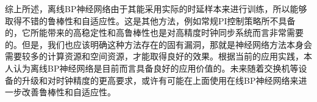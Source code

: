 综上所述，离线BP神经网络由于其能采用实际的时延样本来进行训练，所以能够取得不错的鲁棒性和自适应性。这是其他方法，例如常规PI控制策略所不具备的，它所能带来的高稳定性和高鲁棒性也是对高精度时钟同步系统而言非常需要的。但是，我们也应该明确这种方法存在的固有漏洞，那就是神经网络方法本身会需要较多的计算资源和空间资源，才能取得良好的效果。根据当前的应用实践，本人认为离线BP神经网络是目前而言具备良好的应用价值的。未来随着交换机等设备的升级和对时钟精度的更高要求，或许有可能在上面使用在线BP神经网络来进一步改善鲁棒性和自适应性。









